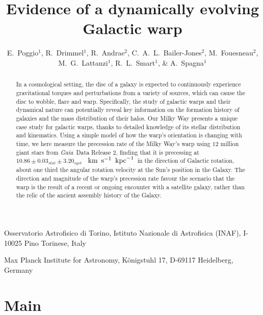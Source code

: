 \documentclass{nature}
\title{Evidence of a dynamically evolving Galactic warp}
\author{E.~Poggio$^{1}$,
R.~Drimmel$^{1}$,
R.~Andrae$^{2}$,
C.~A.~L.~Bailer-Jones$^{2}$,
M.~Fouesneau$^{2}$,
M.~G.~Lattanzi$^{1}$,
R.~L.~Smart$^{1}$, \&
A.~Spagna$^{1}$ 
}
\newcommand{\gaia}{\textit{Gaia}}
\newcommand{\kmskpc}{$\text{\, km} \text{\, s}^{-1} \text{\, kpc}^{-1}$}
\begin{document}

\maketitle

\begin{affiliations}
 \item Osservatorio Astrofisico di Torino, Istituto Nazionale di Astrofisica (INAF), I-10025 Pino Torinese, Italy
 \item Max Planck Institute for Astronomy, K\"onigstuhl 17, D-69117 Heidelberg, Germany
\end{affiliations}



\begin{abstract}

In a cosmological setting, the disc of a galaxy is expected to continuously experience gravitational torques and perturbations from a variety of sources, which can cause the disc to wobble, flare and warp\cite{Binney:1992,Sellwood:2013}. Specifically, the study of galactic warps and their dynamical nature can potentially reveal key information on the formation history of galaxies and the mass distribution of their halos. Our Milky Way presents a unique case study for galactic warps, thanks to detailed knowledge of its stellar distribution and kinematics. Using a simple model of how the warp's orientation is changing with time, we here measure the precession rate of the Milky Way's warp using 12 million giant stars from \gaia\ Data Release 2\cite{Brown:2018}, finding that it is precessing at $10.86 \pm 0.03_{stat} \pm 3.20_{syst}$ \kmskpc\ in the direction of Galactic rotation, about one third the angular rotation velocity at the Sun's position in the Galaxy. The direction and magnitude of the warp’s precession rate favour the scenario that the warp is the result of a recent or ongoing encounter with a satellite galaxy, rather than the relic of the ancient assembly history of the Galaxy.
\end{abstract}

\newpage
\section*{Main}
\end{document}

